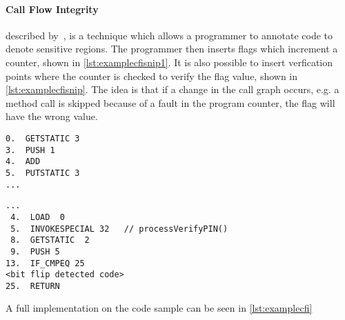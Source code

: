 \paragraph{Call Flow Integrity} described by~\cite{agl}, is a technique which allows a programmer to annotate code to denote sensitive regions. The programmer then inserts flags which increment a counter, shown in \cref{lst:examplecfisnip1}. It is also possible to insert verfication points where the counter is checked to verify the flag value, shown in \cref{lst:examplecfisnip}. The idea is that if a change in the call graph occurs, e.g. a method call is skipped because of a fault in the program counter, the flag will have the wrong value.

\begin{lstlisting}[caption={Java code example of the control flow integrity countermeasure incrementing the control flow flag},label={lst:examplecfisnip1}]
0.  GETSTATIC 3
3.  PUSH 1
4.  ADD
5.  PUTSTATIC 3
...
\end{lstlisting}

\begin{lstlisting}[caption={Java code example of the control flow integrity countermeasure checking the control flow flag},label={lst:examplecfisnip}]
...
 4.  LOAD  0
 5.  INVOKESPECIAL 32   // processVerifyPIN()
 8.  GETSTATIC  2
 9.  PUSH 5
13.  IF_CMPEQ 25
<bit flip detected code>
25.  RETURN
\end{lstlisting}

A full implementation on the code sample can be seen in \cref{lst:examplecfi}
